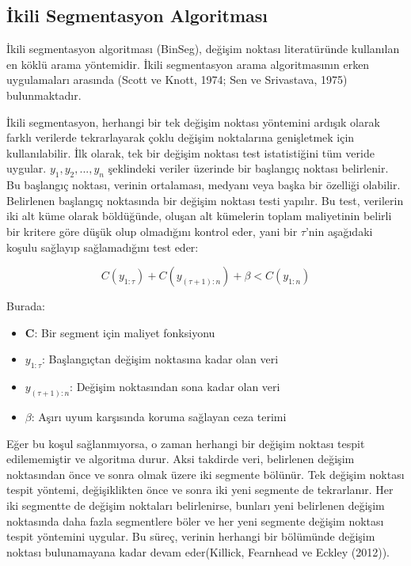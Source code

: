 \documentclass[12pt,twoside]{deuthesis}
\begin{document}
\subsection{İkili Segmentasyon Algoritması}\label{ikili-segmentasyon-algoritmasux131}

İkili segmentasyon algoritması (BinSeg), değişim noktası literatüründe kullanılan en köklü arama yöntemidir. İkili segmentasyon arama algoritmasının erken uygulamaları arasında (Scott ve Knott, 1974; Sen ve Srivastava, 1975) bulunmaktadır.

İkili segmentasyon, herhangi bir tek değişim noktası yöntemini ardışık olarak farklı verilerde tekrarlayarak çoklu değişim noktalarına genişletmek için kullanılabilir. İlk olarak, tek bir değişim noktası test istatistiğini tüm veride uygular. \(y_{1},y_{2},...,y_{n}\) şeklindeki veriler üzerinde bir başlangıç noktası belirlenir. Bu başlangıç noktası, verinin ortalaması, medyanı veya başka bir özelliği olabilir. Belirlenen başlangıç noktasında bir değişim noktası testi yapılır. Bu test, verilerin iki alt küme olarak böldüğünde, oluşan alt kümelerin toplam maliyetinin belirli bir kritere göre düşük olup olmadığını kontrol eder, yani bir \(\tau\)'nin aşağıdaki koşulu sağlayıp sağlamadığını test eder:

\[C(y_{1:\tau}) + C(y_{(\tau+1):n}) + \beta < C(y_{1:n})\]

Burada:

\begin{itemize}
\item \textbf{C}: Bir segment için maliyet fonksiyonu
\item \textbf{$y_{1:\tau}$}: Başlangıçtan değişim noktasına kadar olan veri 
\item \textbf{$y_{(\tau+1):n}$}: Değişim noktasından sona kadar olan veri 
\item \textbf{$\beta$}: Aşırı uyum karşısında koruma sağlayan ceza terimi
\end{itemize}

Eğer bu koşul sağlanmıyorsa, o zaman herhangi bir değişim noktası tespit edilememiştir ve algoritma durur. Aksi takdirde veri, belirlenen değişim noktasından önce ve sonra olmak üzere iki segmente bölünür. Tek değişim noktası tespit yöntemi, değişiklikten önce ve sonra iki yeni segmente de tekrarlanır. Her iki segmentte de değişim noktaları belirlenirse, bunları yeni belirlenen değişim noktasında daha fazla segmentlere böler ve her yeni segmente değişim noktası tespit yöntemini uygular. Bu süreç, verinin herhangi bir bölümünde değişim noktası bulunamayana kadar devam eder(Killick, Fearnhead ve Eckley (2012)).
\end{document}
